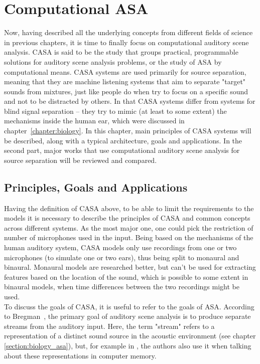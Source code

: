 \chapter{Computational ASA}\label{chapter:casa}

Now, having described all the underlying concepts from different fields of science in previous chapters, it is time to finally focus on computational auditory scene analysis. CASA is said to be the study that groups practical, programmable solutions for auditory scene analysis problems, or the study of ASA by computational means. CASA systems are used primarily for source separation, meaning that they are machine listening systems that aim to separate "target" sounds from mixtures, just like people do when try to focus on a specific sound and not to be distracted by others. In that CASA systems differ from systems for blind signal separation – they try to mimic (at least to some extent) the mechanisms inside the human ear, which were discussed in chapter~\ref{chapter:biology}. In this chapter, main principles of CASA systems will be described, along with a typical architecture, goals and applications. In the second part, major works that use computational auditory scene analysis for source separation will be reviewed and compared.

\section{Principles, Goals and Applications}

Having the definition of CASA above, to be able to limit the requirements to the models it is necessary to describe the principles of CASA and common concepts across different systems. As the most major one, one could pick the restriction of number of microphones used in the input. Being based on the mechanisms of the human auditory system, CASA models only use recordings from one or two microphones (to simulate one or two ears), thus being split to monaural and binaural. Monaural models are researched better, but can't be used for extracting features based on the location of the sound, which is possible to some extent in binaural models, when time differences between the two recordings might be used.\\

To discuss the goals of CASA, it is useful to refer to the goals of ASA. According to Bregman~\cite{Bregman1990}, the primary goal of auditory scene analysis is to produce separate streams from the auditory input. Here, the term "stream" refers to a representation of a distinct sound source in the acoustic environment (see chapter \ref{section:biology_asa}), but, for example in \cite{Wang2006}, the authors also use it when talking about these representations in computer memory.\\

